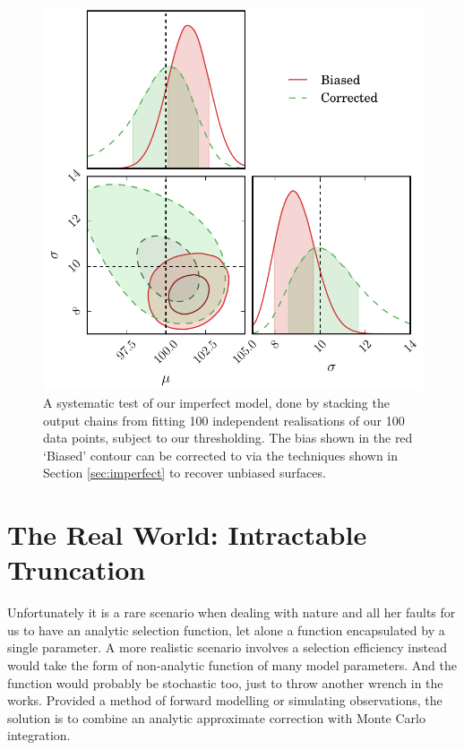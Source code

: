 \documentclass[a4paper,fleqn,usenatbib]{mnras}
\begin{document}
\begin{figure}
	\begin{center}
		\includegraphics[width=\columnwidth]{example/imperfect.pdf}
	\end{center}
	\caption{A systematic test of our imperfect model, done by stacking the output chains from fitting 100 independent realisations of our 100 data points, subject to our thresholding. The bias shown in the red `Biased' contour can be corrected to via the techniques shown in Section \ref{sec:imperfect} to recover unbiased surfaces.}
	\label{fig:imperfect}
\end{figure}

\section{The Real World: Intractable Truncation}
\label{sec:real}
Unfortunately it is a rare scenario when dealing with nature and all her faults for us to have an analytic selection function, let alone a function encapsulated by a single parameter. A more realistic scenario involves a selection efficiency instead would take the form of non-analytic function of many model parameters. And the function would probably be stochastic too, just to throw another wrench in the works. Provided a method of forward modelling or simulating observations, the solution is to combine an analytic approximate correction with Monte Carlo integration.
\end{document}
